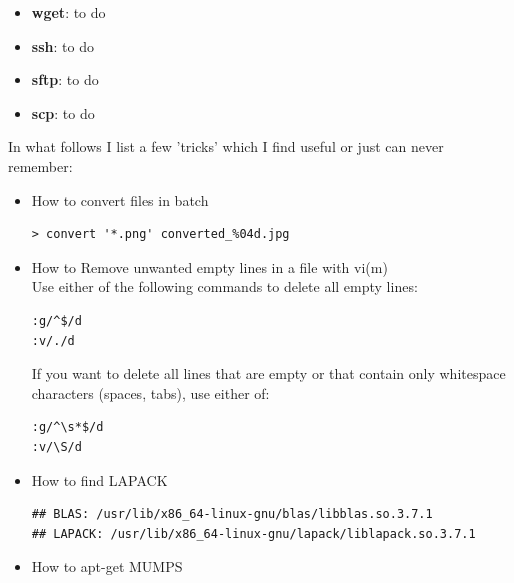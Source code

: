 \begin{itemize}
\item {\color{teal} \bf wget}: to do 
\item {\color{teal} \bf ssh}:   to do 
\item {\color{teal} \bf sftp}:   to do 
\item {\color{teal} \bf scp}:   to do 



\end{itemize} 


\vspace{1cm}

In what follows I list a few 'tricks' which I find useful or just can never remember:

\begin{itemize}
\item How to convert files in batch 

\begin{mdframed}[backgroundcolor=gray!10]
\begin{verbatim}
> convert '*.png' converted_%04d.jpg
\end{verbatim}
\end{mdframed}

\item How to Remove unwanted empty lines in a file with vi(m)\\
Use either of the following commands to delete all empty lines: 
\begin{mdframed}[backgroundcolor=gray!10]
\begin{verbatim}
:g/^$/d
:v/./d
\end{verbatim}
\end{mdframed}
If you want to delete all lines that are empty or that contain only whitespace 
characters (spaces, tabs), use either of: 
\begin{mdframed}[backgroundcolor=gray!10]
\begin{verbatim}
:g/^\s*$/d
:v/\S/d
\end{verbatim}
\end{mdframed}

\item How to find LAPACK
\begin{mdframed}[backgroundcolor=gray!10]
\begin{verbatim}
## BLAS: /usr/lib/x86_64-linux-gnu/blas/libblas.so.3.7.1
## LAPACK: /usr/lib/x86_64-linux-gnu/lapack/liblapack.so.3.7.1
\end{verbatim}
\end{mdframed}

\item How to apt-get MUMPS


\end{itemize}
